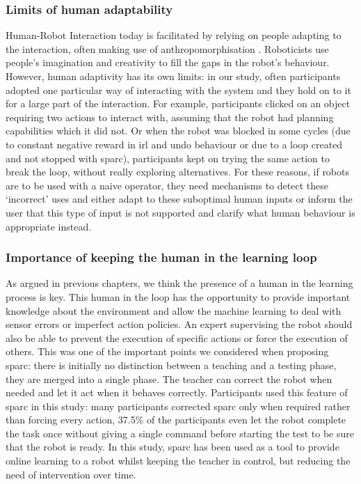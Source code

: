 \subsubsection{Limits of human adaptability}

Human-Robot Interaction today is facilitated by relying on people adapting to the interaction, often making use of anthropomorphisation \citep{zlotowski2015anthropomorphism}. Roboticists use people's imagination and creativity to fill the gaps in the robot's behaviour. However, human adaptivity has its own limits: in our study, often participants adopted one particular way of interacting with the system and they hold on to it for a large part of the interaction. For example, participants clicked on an object requiring two actions to interact with, assuming that the robot had planning capabilities which it did not. Or when the robot was blocked in some cycles (due to constant negative reward in \gls{irl} and undo behaviour or due to a loop created and not stopped with \gls{sparc}), participants kept on trying the same action to break the loop, without really exploring alternatives. For these reasons, if robots are to be used with a naive operator, they need mechanisms to detect these `incorrect' uses and either adapt to these suboptimal human inputs or inform the user that this type of input is not supported and clarify what human behaviour is appropriate instead.

\subsubsection{Importance of keeping the human in the learning loop}

As argued in previous chapters, we think the presence of a human in the learning process is key. This human in the loop has the opportunity to provide important knowledge about the environment and allow the machine learning to deal with sensor errors or imperfect action policies. An expert supervising the robot should also be able to prevent the execution of specific actions or force the execution of others. This was one of the important points we considered when proposing \gls{sparc}: there is initially no distinction between a teaching and a testing phase, they are merged into a single phase. The teacher can correct the robot when needed and let it act when it behaves correctly. Participants used this feature of \gls{sparc} in this study: many participants corrected \gls{sparc} only when required rather than forcing every action, 37.5\% of the participants even let the robot complete the task once without giving a single command before starting the test to be sure that the robot is ready. In this study, \gls{sparc} has been used as a tool to provide online learning to a robot whilst keeping the teacher in control, but reducing the need of intervention over time.

